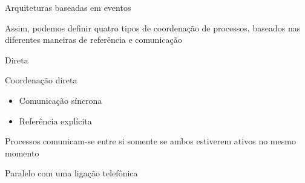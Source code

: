 \documentclass[compress]{beamer}
\begin{document}

\begin{frame}{Arquiteturas baseadas em eventos}

Assim, podemos definir quatro tipos de coordenação de processos, baseados nas diferentes maneiras de referência e comunicação

\begin{table}[]
\def\arraystretch{2.5}
\centering
{}
\end{table}

\end{frame}


\begin{frame}{Direta}

Coordenação direta
\begin{itemize}
    \item Comunicação síncrona
    \item Referência explícita
\end{itemize}

\vspace{0.5cm}

Processos comunicam-se entre si somente se ambos estiverem ativos no mesmo momento

\vspace{0.5cm}

Paralelo com uma ligação telefônica

\end{frame}

\end{document}

